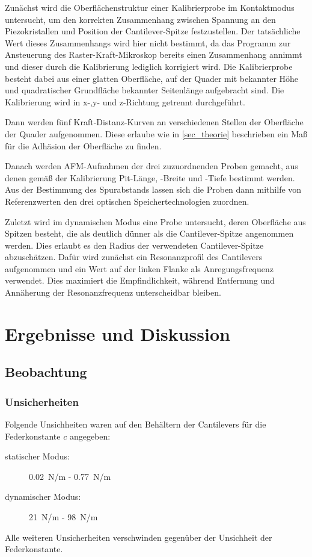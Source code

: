 \documentclass[
	a4paper,
	12pt,
	pagesize,
	ngerman
]{scrartcl}
\begin{document}
	Zunächst wird die Oberflächenstruktur einer Kalibrierprobe im Kontaktmodus untersucht, um den korrekten Zusammenhang zwischen Spannung an den Piezokristallen und Position der Cantilever-Spitze festzustellen.
	Der tatsächliche Wert dieses Zusammenhangs wird hier nicht bestimmt, da das Programm zur Ansteuerung des Raster-Kraft-Mikroskop bereits einen Zusammenhang annimmt und dieser durch die Kalibrierung lediglich korrigiert wird.
	Die Kalibrierprobe besteht dabei aus einer glatten Oberfläche, auf der Quader mit bekannter Höhe und quadratischer Grundfläche bekannter Seitenlänge aufgebracht sind.
	Die Kalibrierung wird in x-,y- und z-Richtung getrennt durchgeführt.

	Dann werden fünf Kraft-Distanz-Kurven an verschiedenen Stellen der Oberfläche der Quader aufgenommen.
	Diese erlaube wie in \cref{sec_theorie} beschrieben ein Maß für die Adhäsion der Oberfläche zu finden. %

	Danach werden AFM-Aufnahmen der drei zuzuordnenden Proben gemacht, aus denen gemäß der Kalibrierung Pit-Länge, -Breite und -Tiefe bestimmt werden.
	Aus der Bestimmung des Spurabstands lassen sich die Proben dann mithilfe von Referenzwerten den drei optischen Speichertechnologien zuordnen.

	Zuletzt wird im dynamischen Modus eine Probe untersucht, deren Oberfläche aus Spitzen besteht, die als deutlich dünner als die Cantilever-Spitze angenommen werden.
	Dies erlaubt es den Radius der verwendeten Cantilever-Spitze abzuschätzen. %
	Dafür wird zunächst ein Resonanzprofil des Cantilevers aufgenommen und ein Wert auf der linken Flanke als Anregungsfrequenz verwendet.
	Dies maximiert die Empfindlichkeit, während Entfernung und Annäherung der Resonanzfrequenz unterscheidbar bleiben.

	\section{Ergebnisse und Diskussion}


	\subsection{Beobachtung}
	\subsubsection{Unsicherheiten} %
	Folgende Unsichheiten waren auf den Behältern der Cantilevers für die Federkonstante $c$ angegeben:
	\begin{description}
		\item[statischer Modus:] \SI{0.02}{N/m} - \SI{0.77}{N/m} %
		\item[dynamischer Modus:] \SI{21}{N/m} - \SI{98}{N/m}
	\end{description}
	Alle weiteren Unsicherheiten verschwinden gegenüber der Unsichheit der Federkonstante.
\end{document}
